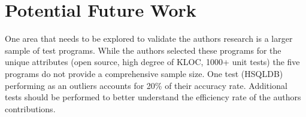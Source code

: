 \documentclass[conference]{IEEEtran}
\begin{document}
\section{Potential Future Work}
One area that needs to be explored to validate the authors research is a larger sample of test programs. While the authors selected these programs for the unique attributes (open source, high degree of KLOC, 1000+ unit tests) the five programs do not provide a comprehensive sample size. One test (HSQLDB) performing as an outliers accounts for 20\% of their accuracy rate. Additional tests should be performed to better understand the efficiency rate of the authors contributions.

 

%
%


\end{document}
